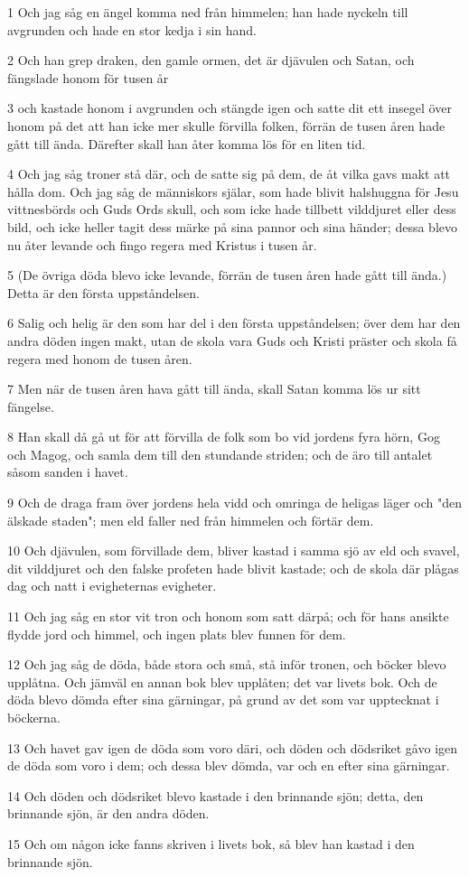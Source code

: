 \par 1 Och jag såg en ängel komma ned från himmelen; han hade nyckeln till avgrunden och hade en stor kedja i sin hand.
\par 2 Och han grep draken, den gamle ormen, det är djävulen och Satan, och fängslade honom för tusen år
\par 3 och kastade honom i avgrunden och stängde igen och satte dit ett insegel över honom på det att han icke mer skulle förvilla folken, förrän de tusen åren hade gått till ända. Därefter skall han åter komma lös för en liten tid.
\par 4 Och jag såg troner stå där, och de satte sig på dem, de åt vilka gavs makt att hålla dom. Och jag såg de människors själar, som hade blivit halshuggna för Jesu vittnesbörds och Guds Ords skull, och som icke hade tillbett vilddjuret eller dess bild, och icke heller tagit dess märke på sina pannor och sina händer; dessa blevo nu åter levande och fingo regera med Kristus i tusen år.
\par 5 (De övriga döda blevo icke levande, förrän de tusen åren hade gått till ända.) Detta är den första uppståndelsen.
\par 6 Salig och helig är den som har del i den första uppståndelsen; över dem har den andra döden ingen makt, utan de skola vara Guds och Kristi präster och skola få regera med honom de tusen åren.
\par 7 Men när de tusen åren hava gått till ända, skall Satan komma lös ur sitt fängelse.
\par 8 Han skall då gå ut för att förvilla de folk som bo vid jordens fyra hörn, Gog och Magog, och samla dem till den stundande striden; och de äro till antalet såsom sanden i havet.
\par 9 Och de draga fram över jordens hela vidd och omringa de heligas läger och "den älskade staden"; men eld faller ned från himmelen och förtär dem.
\par 10 Och djävulen, som förvillade dem, bliver kastad i samma sjö av eld och svavel, dit vilddjuret och den falske profeten hade blivit kastade; och de skola där plågas dag och natt i evigheternas evigheter.
\par 11 Och jag såg en stor vit tron och honom som satt därpå; och för hans ansikte flydde jord och himmel, och ingen plats blev funnen för dem.
\par 12 Och jag såg de döda, både stora och små, stå inför tronen, och böcker blevo upplåtna. Och jämväl en annan bok blev upplåten; det var livets bok. Och de döda blevo dömda efter sina gärningar, på grund av det som var upptecknat i böckerna.
\par 13 Och havet gav igen de döda som voro däri, och döden och dödsriket gåvo igen de döda som voro i dem; och dessa blev dömda, var och en efter sina gärningar.
\par 14 Och döden och dödsriket blevo kastade i den brinnande sjön; detta, den brinnande sjön, är den andra döden.
\par 15 Och om någon icke fanns skriven i livets bok, så blev han kastad i den brinnande sjön.

